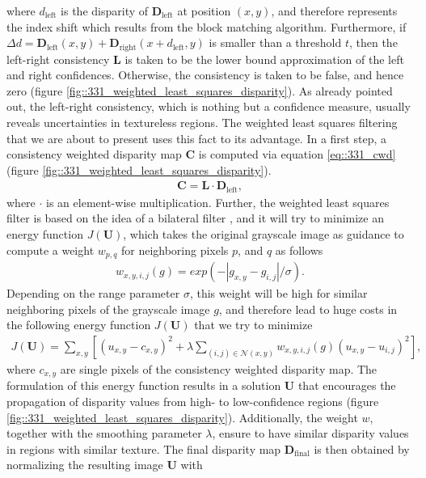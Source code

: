 where $d_\text{left}$ is the disparity of $\bm{D}_\text{left}$ at position $(x,y)$, and therefore represents the index shift which results from the block matching algorithm. Furthermore, if $\Delta d = \bm{D}_\text{left}(x, y) + \bm{D}_\text{right}(x + d_\text{left}, y)$ is smaller than a threshold $t$, then the left-right consistency $\bm{L}$ is taken to be the lower bound approximation of the left and right confidences. Otherwise, the consistency is taken to be false, and hence zero (figure \ref{fig::331_weighted_least_squares_disparity}). As already pointed out, the left-right consistency, which is nothing but a confidence measure, usually reveals uncertainties in textureless regions. The weighted least squares filtering that we are about to present uses this fact to its advantage. In a first step, a consistency weighted disparity map $\bm{C}$ is computed via equation \ref{eq::331_cwd} (figure \ref{fig::331_weighted_least_squares_disparity}).
\begin{align}
	\bm{C}=\bm{L}\cdot\bm{D}_\text{left},
	\label{eq::331_cwd}
\end{align}
where $\cdot$ is an element-wise multiplication. Further, the weighted least squares filter is based on the idea of a bilateral filter \cite{tomasi1998bilateral}, and it will try to minimize an energy function $J(\bm{U})$, which takes the original grayscale image as guidance to compute a weight $w_{p,q}$ for neighboring pixels $p$, and $q$ as follows
\begin{align}
	w_{x,y,i,j}(g) = exp(-|g_{x,y}-g_{i,j}|/\sigma).
	\label{eq::331_weight}
\end{align}
Depending on the range parameter $\sigma$, this weight will be high for similar neighboring pixels of the grayscale image $g$, and therefore lead to huge costs in the following energy function $J(\bm{U})$ that we try to minimize
\begin{align}
	J(\bm{U}) = \sum_{x,y}\left[(u_{x,y}-c_{x,y})^2+\lambda\sum_{(i,j)\in\mathcal{N}(x,y)}w_{x,y,i,j}(g)(u_{x,y}-u_{i,j})^2\right],
	\label{eq::331_energy_function}
\end{align}
where $c_{x,y}$ are single pixels of the consistency weighted disparity map. The formulation of this energy function results in a solution $\bm{U}$ that encourages the propagation of disparity values from high- to low-confidence regions (figure \ref{fig::331_weighted_least_squares_disparity}). Additionally, the weight $w$, together with the smoothing parameter $\lambda$, ensure to have similar disparity values in regions with similar texture. The final disparity map $\bm{D}_\text{final}$ is then obtained by normalizing the resulting image $\bm{U}$ with

